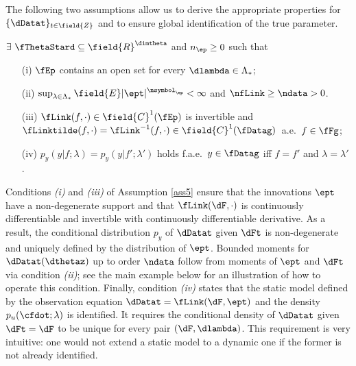 The following two assumptions allow us to derive the appropriate properties for 
$\{\dDatat\}_{t\in \field{Z}}$ and 
to ensure global identification of the true parameter. 


%
%
%
%
\begin{ass}
\label{ass5}
$\exists \ \fThetaStard \subseteq \field{R}^{\dimtheta}$ and $n_\ep\geq 0$ such that 
\begin{enumerate}   
    \item[(i)] $\fEp$ contains an open set for every $\dlambda \in \Lambda_{*}$;
    \item[(ii)]$\sup_{\lambda \in \Lambda_{*}} \field{E} |\ept|^{\nsymbol_\ep}<\infty$ and $\nfLink \geq \ndata>0$.
\item[(iii)]  $\fLink(f,\cdot) \in \field{C}^{1}(\fEp)$ is invertible and $\fLinktilde(f,\cdot) = \fLink^{-1}(f,\cdot) \in \field{C}^{1}(\fDatag)$\ a.e.~$f \in\fFg$;
    \item[(iv)] $p_{y}(y|f;\lambda)=p_{y}(y|f';\lambda')$ holds f.a.e.~$y \in \fDatag$ iff $f=f'$ and $\lambda=\lambda'$. 
\end{enumerate}
\end{ass}

Conditions \textit{(i)} and \textit{(iii)} of Assumption \ref{ass5} ensure that the  innovations $\ept$ have a  non-degenerate support and that  $\fLink(\dF,\cdot)$ is continuously differentiable and invertible with continuously differentiable derivative. As a result, the conditional distribution $p_{y}$ of $\dDatat$ given $\dFt$ is non-degenerate and uniquely defined by the distribution of $\ept$.
Bounded moments for $\dDatat(\dthetaz)$ up to order $\ndata$ follow from moments of $\ept$ and $\dFt$ via condition \textit{(ii)}; see the main example below for an illustration of how to operate this condition. 
Finally, condition \textit{(iv)} states that the static model defined by the observation equation $\dDatat=\fLink(\dF,\ept)$ and the density $p_{u}(\cfdot;\lambda)$ is identified. It requires the conditional density of $\dDatat$ given $\dFt=\dF$ to be unique for every pair $(\dF,\dlambda)$. 
This requirement is very intuitive: one would not extend a static model to a dynamic one if the former is not already identified.

